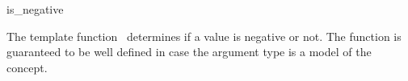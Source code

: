 \begin{ccRefFunction}{is_negative}

\ccDefinition

The template function \ccRefName\ determines if a value is negative or not.
The function is guaranteed to be well defined in case the argument type 
is a model of the  concept. 


{}

\ccSeeAlso
{} \\
\\

\end{ccRefFunction}
